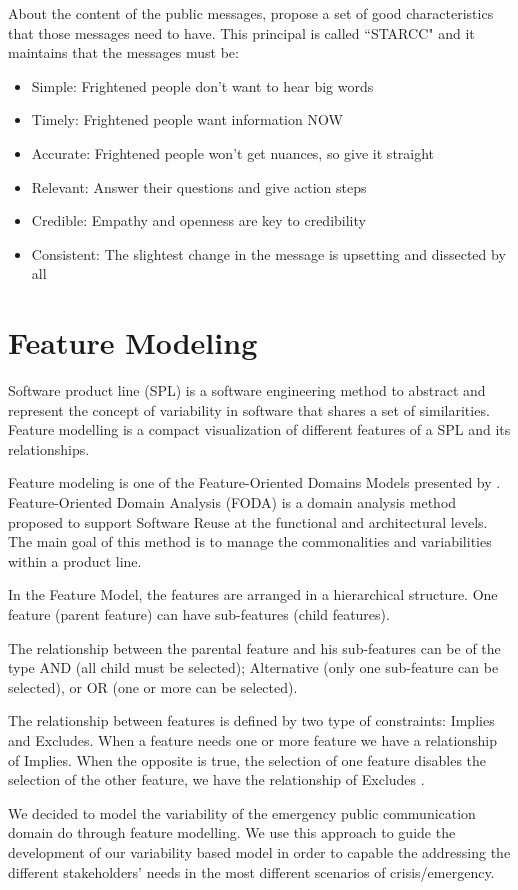  About the content of the public messages, \cite{reynolds2007crisis} propose a set of good characteristics that those messages need to have. This principal is called “STARCC" and it maintains that the messages must be:
 
 \begin{itemize}
   \item Simple: Frightened people don’t want to hear big words
   \item Timely: Frightened people want information NOW
   \item Accurate: Frightened people won’t get nuances, so give it straight
   \item Relevant: Answer their questions and give action steps
   \item Credible: Empathy and openness are key to credibility
   \item Consistent: The slightest change in the message is upsetting and
dissected by all
      
 \end{itemize}

\section{Feature Modeling}

Software product line (SPL) \citep{malizia2010sema4a} is a software engineering method to abstract and represent the concept of variability in software that shares a set of similarities. Feature modelling is a compact visualization of different features of a SPL and its relationships. 

Feature modeling is one of the Feature-Oriented Domains Models presented by \cite{Kang1990}. Feature-Oriented Domain Analysis (FODA) is a domain analysis method proposed to support Software Reuse \citep{krueger1992software} at the functional and architectural levels. The main goal of this method is to manage the commonalities and variabilities within a product line.  

In the Feature Model, the features are arranged in a hierarchical structure. One feature (parent feature) can have sub-features (child features). 

The relationship between the parental feature and his sub-features can be of the type AND (all child must be selected); Alternative (only one sub-feature can be selected), or OR (one or more can be selected). 

The relationship between features is defined by two type of constraints: Implies and Excludes. When a feature needs one or more feature we have a relationship of Implies. When the opposite is true, the selection of one feature disables the selection of the other feature, we have the relationship of Excludes \citep{batory2005feature}.

We decided to model the variability of the emergency public communication domain do through feature modelling. We use this approach to guide the development of our variability based model in order to capable the addressing the different stakeholders’ needs in the most different scenarios of crisis/emergency.